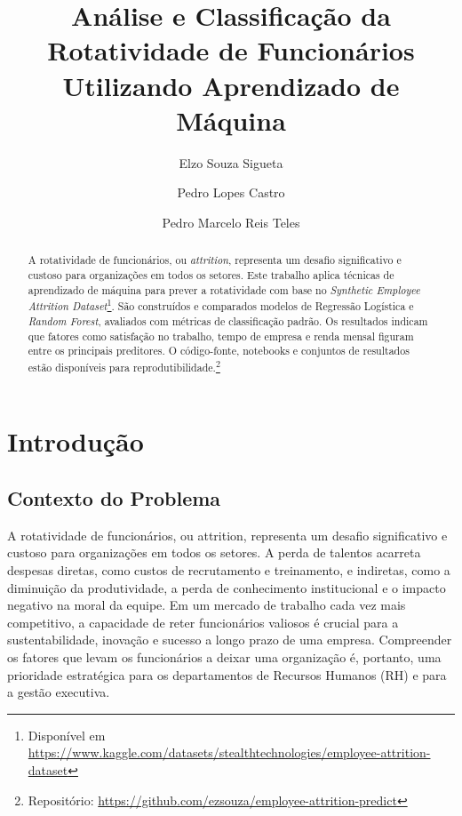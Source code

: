 \documentclass[sigconf]{acmart}
\begin{document}
\title{Análise e Classificação da Rotatividade de Funcionários Utilizando Aprendizado de Máquina}

\author{Elzo Souza Sigueta}

\author{Pedro Lopes Castro}

\author{Pedro Marcelo Reis Teles}

\renewcommand{\shortauthors}{Sigueta, Castro e Teles}

\begin{abstract}
A rotatividade de funcionários, ou \textit{attrition}, representa um desafio significativo e custoso para organizações em todos os setores. Este trabalho aplica técnicas de aprendizado de máquina para prever a rotatividade com base no \textit{Synthetic Employee Attrition Dataset}\footnote{Disponível em \url{https://www.kaggle.com/datasets/stealthtechnologies/employee-attrition-dataset}}. São construídos e comparados modelos de Regressão Logística e \textit{Random Forest}, avaliados com métricas de classificação padrão. Os resultados indicam que fatores como satisfação no trabalho, tempo de empresa e renda mensal figuram entre os principais preditores. O código-fonte, notebooks e conjuntos de resultados estão disponíveis para reprodutibilidade.\footnote{Repositório: \url{https://github.com/ezsouza/employee-attrition-predict}}
\end{abstract}

\maketitle
\section{Introdução}
\subsection{Contexto do Problema}
A rotatividade de funcionários, ou attrition, representa um desafio significativo e custoso para organizações em todos os setores. A perda de talentos acarreta despesas diretas, como custos de recrutamento e treinamento, e indiretas, como a diminuição da produtividade, a perda de conhecimento institucional e o impacto negativo na moral da equipe. Em um mercado de trabalho cada vez mais competitivo, a capacidade de reter funcionários valiosos é crucial para a sustentabilidade, inovação e sucesso a longo prazo de uma empresa. Compreender os fatores que levam os funcionários a deixar uma organização é, portanto, uma prioridade estratégica para os departamentos de Recursos Humanos (RH) e para a gestão executiva.
\end{document}
